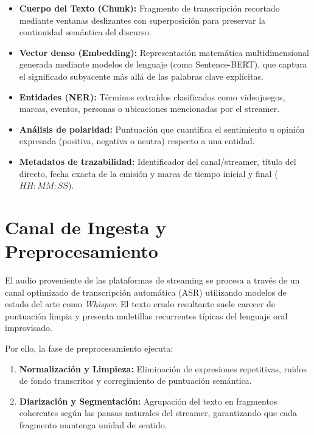 \documentclass[12pt,a4paper]{article}
\begin{document}
\begin{itemize}
  \item \textbf{Cuerpo del Texto (Chunk):} Fragmento de transcripción recortado mediante ventanas deslizantes con superposición para preservar la continuidad semántica del discurso.
  \item \textbf{Vector denso (Embedding):} Representación matemática multidimensional generada mediante modelos de lenguaje (como Sentence-BERT), que captura el significado subyacente más allá de las palabras clave explícitas.
  \item \textbf{Entidades (NER):} Términos extraídos clasificados como videojuegos, marcas, eventos, personas o ubicaciones mencionadas por el streamer.
  \item \textbf{Análisis de polaridad:} Puntuación que cuantifica el sentimiento u opinión expresada (positiva, negativa o neutra) respecto a una entidad.
  \item \textbf{Metadatos de trazabilidad:} Identificador del canal/streamer, título del directo, fecha exacta de la emisión y marca de tiempo inicial y final ($HH:MM:SS$).
\end{itemize}

\section{Canal de Ingesta y Preprocesamiento}
El audio proveniente de las plataformas de streaming se procesa a través de un canal optimizado de transcripción automática (ASR) utilizando modelos de estado del arte como \emph{Whisper}. El texto crudo resultante suele carecer de puntuación limpia y presenta muletillas recurrentes típicas del lenguaje oral improvisado. 

Por ello, la fase de preprocesamiento ejecuta:
\begin{enumerate}
  \item \textbf{Normalización y Limpieza:} Eliminación de expresiones repetitivas, ruidos de fondo transcritos y corregimiento de puntuación semántica.
  \item \textbf{Diarización y Segmentación:} Agrupación del texto en fragmentos coherentes según las pausas naturales del streamer, garantizando que cada fragmento mantenga unidad de sentido.
\end{enumerate}
\end{document}
